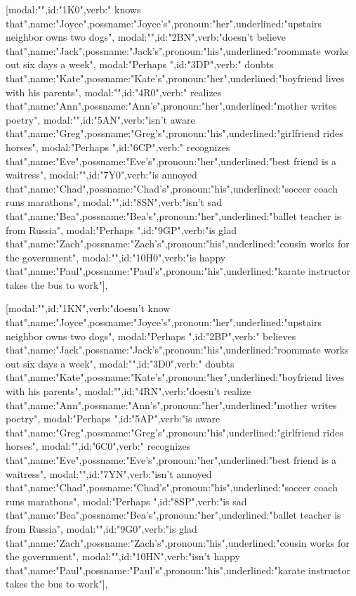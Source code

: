 [{modal:"",id:"1K0",verb:" knows that",name:"Joyce",possname:"Joyce's",pronoun:"her",underlined:"upstairs neighbor owns two dogs"},
{modal:"",id:"2BN",verb:"doesn't believe that",name:"Jack",possname:"Jack's",pronoun:"his",underlined:"roommate works out six days a week"},
{modal:"Perhaps ",id:"3DP",verb:" doubts that",name:"Kate",possname:"Kate's",pronoun:"her",underlined:"boyfriend lives with his parents"},
{modal:"",id:"4R0",verb:" realizes that",name:"Ann",possname:"Ann's",pronoun:"her",underlined:"mother writes poetry"},
{modal:"",id:"5AN",verb:"isn't aware that",name:"Greg",possname:"Greg's",pronoun:"his",underlined:"girlfriend rides horses"},
{modal:"Perhaps ",id:"6CP",verb:" recognizes that",name:"Eve",possname:"Eve's",pronoun:"her",underlined:"best friend is a waitress"},
{modal:"",id:"7Y0",verb:"is annoyed that",name:"Chad",possname:"Chad's",pronoun:"his",underlined:"soccer coach runs marathons"},
{modal:"",id:"8SN",verb:"isn't sad that",name:"Bea",possname:"Bea's",pronoun:"her",underlined:"ballet teacher is from Russia"},
{modal:"Perhaps ",id:"9GP",verb:"is glad that",name:"Zach",possname:"Zach's",pronoun:"his",underlined:"cousin works for the government"},
{modal:"",id:"10H0",verb:"is happy that",name:"Paul",possname:"Paul's",pronoun:"his",underlined:"karate instructor takes the bus to work"}],

[{modal:"",id:"1KN",verb:"doesn't know that",name:"Joyce",possname:"Joyce's",pronoun:"her",underlined:"upstairs neighbor owns two dogs"},
{modal:"Perhaps ",id:"2BP",verb:" believes that",name:"Jack",possname:"Jack's",pronoun:"his",underlined:"roommate works out six days a week"},
{modal:"",id:"3D0",verb:" doubts that",name:"Kate",possname:"Kate's",pronoun:"her",underlined:"boyfriend lives with his parents"},
{modal:"",id:"4RN",verb:"doesn't realize that",name:"Ann",possname:"Ann's",pronoun:"her",underlined:"mother writes poetry"},
{modal:"Perhaps ",id:"5AP",verb:"is aware that",name:"Greg",possname:"Greg's",pronoun:"his",underlined:"girlfriend rides horses"},
{modal:"",id:"6C0",verb:" recognizes that",name:"Eve",possname:"Eve's",pronoun:"her",underlined:"best friend is a waitress"},
{modal:"",id:"7YN",verb:"isn't annoyed that",name:"Chad",possname:"Chad's",pronoun:"his",underlined:"soccer coach runs marathons"},
{modal:"Perhaps ",id:"8SP",verb:"is sad that",name:"Bea",possname:"Bea's",pronoun:"her",underlined:"ballet teacher is from Russia"},
{modal:"",id:"9G0",verb:"is glad that",name:"Zach",possname:"Zach's",pronoun:"his",underlined:"cousin works for the government"},
{modal:"",id:"10HN",verb:"isn't happy that",name:"Paul",possname:"Paul's",pronoun:"his",underlined:"karate instructor takes the bus to work"}],

